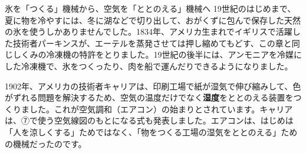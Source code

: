 \begin{column}{氷を「つくる」機械から、空気を「ととのえる」機械へ}
19世紀のはじめまで、夏に物を冷やすには、冬に湖などで切り出して、おがくずに包んで保存した天然の氷を使うしかありませんでした。1834年、アメリカ生まれでイギリスで活躍した技術者パーキンスが、エーテルを蒸発させては押し縮めてもどす、この章と同じしくみの冷凍機の特許をとりました。19世紀の後半には、アンモニアを冷媒にした冷凍機で、氷をつくったり、肉を船で運んだりできるようになりました。

1902年、アメリカの技術者キャリアは、印刷工場で紙が湿気で伸び縮みして、色がずれる問題を解決するため、空気の温度だけでなく\textbf{湿度}をととのえる装置をつくりました。これが空気調和（エアコン）の始まりとされています。キャリアは、⑦で使う空気線図のもとになる式も発表しました。エアコンは、はじめは「人を涼しくする」ためではなく、「物をつくる工場の湿気をととのえる」ための機械だったのです。
\end{column}

